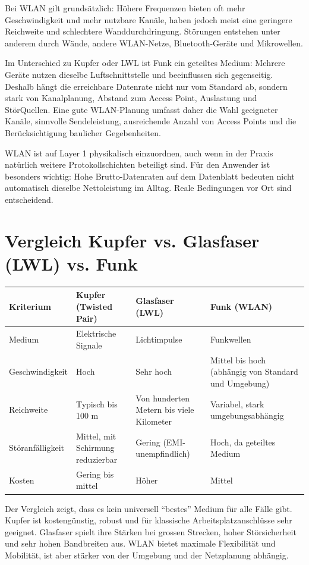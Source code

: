 \documentclass[11pt, oneside, numbers=nönddot]{scrbook}
\begin{document}
Bei WLAN gilt grundsätzlich: Höhere Frequenzen bieten oft mehr Geschwindigkeit und mehr nutzbare Kanäle, haben jedoch meist eine geringere Reichweite und schlechtere Wanddurchdringung. Störungen entstehen unter anderem durch Wände, andere WLAN-Netze, Bluetooth-Geräte und Mikrowellen.

Im Unterschied zu Kupfer oder LWL ist Funk ein geteiltes Medium: Mehrere Geräte nutzen dieselbe Luftschnittstelle und beeinflussen sich gegenseitig. Deshalb hängt die erreichbare Datenrate nicht nur vom Standard ab, sondern stark von Kanalplanung, Abstand zum Access Point, Auslastung und StörQuellen. Eine gute WLAN-Planung umfasst daher die Wahl geeigneter Kanäle, sinnvolle Sendeleistung, ausreichende Anzahl von Access Points und die Berücksichtigung baulicher Gegebenheiten.

WLAN ist auf Layer 1 physikalisch einzuordnen, auch wenn in der Praxis natürlich weitere Protokollschichten beteiligt sind. Für den Anwender ist besonders wichtig: Hohe Brutto-Datenraten auf dem Datenblatt bedeuten nicht automatisch dieselbe Nettoleistung im Alltag. Reale Bedingungen vor Ort sind entscheidend.
\newpage
\section{Vergleich Kupfer vs. Glasfaser (LWL) vs. Funk}
\begin{longtable}{|p{2.9cm}|p{4.2cm}|p{4.2cm}|p{3.6cm}|}
\hline
\textbf{Kriterium} & \textbf{Kupfer (Twisted Pair)} & \textbf{Glasfaser (LWL)} & \textbf{Funk (WLAN)} \\
\hline
Medium & Elektrische Signale & Lichtimpulse & Funkwellen \\
\hline
Geschwindigkeit & Hoch & Sehr hoch & Mittel bis hoch (abhängig von Standard und Umgebung) \\
\hline
Reichweite & Typisch bis 100 m & Von hunderten Metern bis viele Kilometer & Variabel, stark umgebungsabhängig \\
\hline
Störanfälligkeit & Mittel, mit Schirmung reduzierbar & Gering (EMI-unempfindlich) & Hoch, da geteiltes Medium \\
\hline
Kosten & Gering bis mittel & Höher & Mittel \\
\hline
\end{longtable}

Der Vergleich zeigt, dass es kein universell ``bestes'' Medium für alle Fälle gibt. Kupfer ist kostengünstig, robust und für klassische Arbeitsplatzanschlüsse sehr geeignet. Glasfaser spielt ihre Stärken bei grossen Strecken, hoher Störsicherheit und sehr hohen Bandbreiten aus. WLAN bietet maximale Flexibilität und Mobilität, ist aber stärker von der Umgebung und der Netzplanung abhängig.
\end{document}
